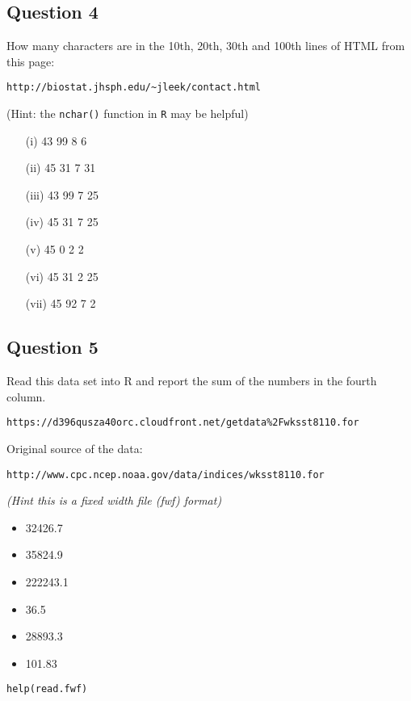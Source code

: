 \documentclass[12pt]{article}
\begin{document}
\newpage
\subsection*{Question 4}
How many characters are in the 10th, 20th, 30th and 100th lines of HTML from this page: 
\begin{verbatim}
http://biostat.jhsph.edu/~jleek/contact.html 
\end{verbatim}
(Hint: the \texttt{nchar()} function in \texttt{R} may be helpful)
\begin{itemize}
\item[(i)] 43 99 8 6
\item[(ii)] 45 31 7 31
\item[(iii)] 43 99 7 25
\item[(iv)] 45 31 7 25
\item[(v)] 45 0 2 2
\item[(vi)] 45 31 2 25
\item[(vii)] 45 92 7 2
\end{itemize}

\newpage
\subsection*{Question 5}
Read this data set into R and report the sum of the numbers in the fourth column. 
\begin{verbatim}
https://d396qusza40orc.cloudfront.net/getdata%2Fwksst8110.for 
\end{verbatim} 

\noindent Original source of the data:
\begin{verbatim}
http://www.cpc.ncep.noaa.gov/data/indices/wksst8110.for 
\end{verbatim} 

\textit{(Hint this is a fixed width file (fwf) format)}
\begin{itemize}
\item 32426.7
\item 35824.9
\item 222243.1
\item 36.5
\item 28893.3
\item 101.83
\end{itemize}

\begin{framed}
\begin{verbatim}
help(read.fwf)
\end{verbatim}	
\end{framed}
\end{document}
